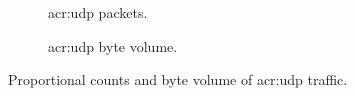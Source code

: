 \begin{figure}
	\centering
	\begin{subfigure}{\linewidth}
		\centering
		\caption{\gls{acr:udp} packets.}
	\end{subfigure}
	\begin{subfigure}{\linewidth}
		\centering
		\caption{\gls{acr:udp} byte volume.}
	\end{subfigure}
	\caption[Proportional counts and byte volume of UDP traffic.]{Proportional counts and byte volume of \gls{acr:udp} traffic.\label{fig:caida-udp}}
\end{figure}


